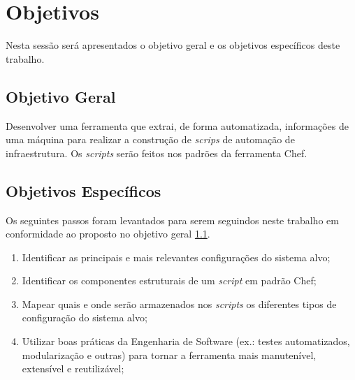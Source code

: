 \section{Objetivos}
\label{sec:obj}

Nesta sessão será apresentados o objetivo geral e os objetivos específicos
deste trabalho.

\subsection{Objetivo Geral}
\label{sec:obj-grl}

Desenvolver uma ferramenta que extrai, de forma automatizada, informações
de uma máquina para realizar a construção de \textit{scrips} de automação
de infraestrutura. Os \textit{scripts} serão feitos nos padrões da ferramenta
Chef.

\subsection{Objetivos Específicos}
\label{sec:obj-esp}

Os seguintes passos foram levantados para serem seguindos neste trabalho
em conformidade ao proposto no objetivo geral \ref{sec:obj-grl}.

\begin{enumerate}
  \item Identificar as principais e mais relevantes configurações do sistema
  alvo;
  \item Identificar os componentes estruturais de um \textit{script} em padrão
  Chef;
  \item Mapear quais e onde serão armazenados nos \textit{scripts} os
  diferentes tipos de configuração do sistema alvo;
  \item Utilizar boas práticas da Engenharia de Software (ex.: testes
  automatizados, modularização e outras) para tornar a ferramenta mais
  manutenível, extensível e reutilizável;
\end{enumerate}
